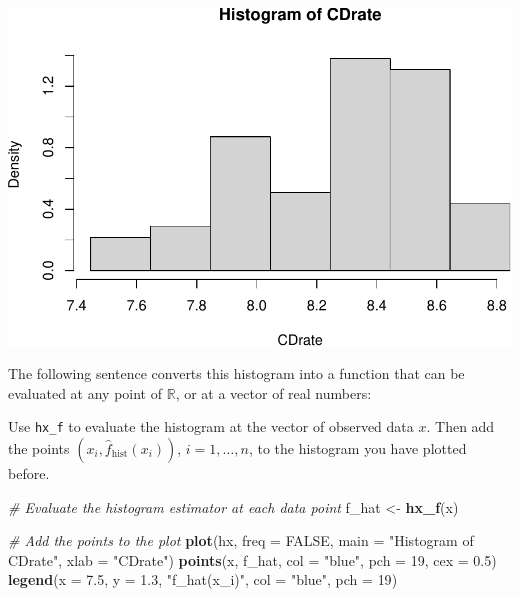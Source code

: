 \documentclass[
]{article}
\newenvironment{Shaded}{\begin{snugshade}}{\end{snugshade}}
\newcommand{\AttributeTok}[1]{\textcolor[rgb]{0.13,0.29,0.53}{#1}}
\newcommand{\CommentTok}[1]{\textcolor[rgb]{0.56,0.35,0.01}{\textit{#1}}}
\newcommand{\ConstantTok}[1]{\textcolor[rgb]{0.56,0.35,0.01}{#1}}
\newcommand{\DecValTok}[1]{\textcolor[rgb]{0.00,0.00,0.81}{#1}}
\newcommand{\FloatTok}[1]{\textcolor[rgb]{0.00,0.00,0.81}{#1}}
\newcommand{\FunctionTok}[1]{\textcolor[rgb]{0.13,0.29,0.53}{\textbf{#1}}}
\newcommand{\NormalTok}[1]{#1}
\newcommand{\OtherTok}[1]{\textcolor[rgb]{0.56,0.35,0.01}{#1}}
\newcommand{\SpecialCharTok}[1]{\textcolor[rgb]{0.81,0.36,0.00}{\textbf{#1}}}
\newcommand{\StringTok}[1]{\textcolor[rgb]{0.31,0.60,0.02}{#1}}
\begin{document}
\begin{center}\includegraphics{20250930_AMA_Density_Estimation_files/figure-latex/2_Plot_hist-1} \end{center}

The following sentence converts this histogram into a function that can
be evaluated at any point of \(\mathbb{R}\), or at a vector of real
numbers:

\begin{Shaded}
\end{Shaded}

Use \texttt{hx\_f} to evaluate the histogram at the vector of observed
data \(x\). Then add the points \((x_i,\hat{f}_{\mathrm{hist}}(x_i))\),
\(i=1,\dots,n\), to the histogram you have plotted before.

\begin{Shaded}
\begin{Highlighting}[]
\CommentTok{\# Evaluate the histogram estimator at each data point}
\NormalTok{f\_hat }\OtherTok{\textless{}{-}} \FunctionTok{hx\_f}\NormalTok{(x)}

\CommentTok{\# Add the points to the plot}
\FunctionTok{plot}\NormalTok{(hx, }\AttributeTok{freq =} \ConstantTok{FALSE}\NormalTok{, }\AttributeTok{main =} \StringTok{"Histogram of CDrate"}\NormalTok{, }\AttributeTok{xlab =} \StringTok{"CDrate"}\NormalTok{)}
\FunctionTok{points}\NormalTok{(x, f\_hat, }\AttributeTok{col =} \StringTok{"blue"}\NormalTok{, }\AttributeTok{pch =} \DecValTok{19}\NormalTok{, }\AttributeTok{cex =} \FloatTok{0.5}\NormalTok{)}
\FunctionTok{legend}\NormalTok{(}\AttributeTok{x =} \FloatTok{7.5}\NormalTok{, }\AttributeTok{y =} \FloatTok{1.3}\NormalTok{, }\StringTok{"f\_hat(x\_i)"}\NormalTok{, }\AttributeTok{col =} \StringTok{"blue"}\NormalTok{, }\AttributeTok{pch =} \DecValTok{19}\NormalTok{)}
\end{Highlighting}
\end{Shaded}
\end{document}
